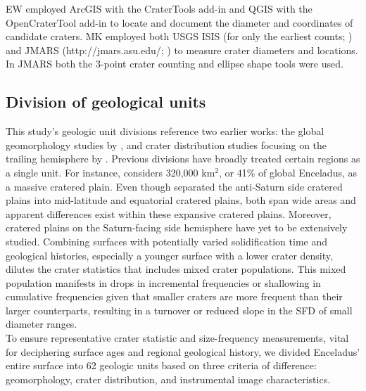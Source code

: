 \documentclass[preprint,11pt,3p,times,authoryear]{elsarticle}
\begin{document}
EW employed ArcGIS with the CraterTools add-in \citep{Kneissl2011} and QGIS with the OpenCraterTool add-in \citep{Heyer2023} to locate and document the diameter and coordinates of candidate craters. MK employed both USGS ISIS (for only the earliest counts; \citealt{Kirchoff2009}) and JMARS (http://jmars.asu.edu/; \citealt{Christensen2009}) to measure crater diameters and locations.  In JMARS both the 3-point crater counting and ellipse shape tools were used.

\subsection{Division of geological units}
\label{sub:gu}
This study’s geologic unit divisions reference two earlier works: the global geomorphology studies by \citet{CrowWillard2015}, and crater distribution studies focusing on the trailing hemisphere by \citet{Kirchoff2009}. Previous divisions have broadly treated certain regions as a single unit.
For instance, \citet{CrowWillard2015} considers 320,000 km$^{2}$, or 41\% of global Enceladus, as a massive cratered plain. Even though \citet{Kirchoff2009} separated the anti-Saturn side cratered plains into mid-latitude and equatorial cratered plains, both span wide areas and apparent differences exist within these expansive cratered plains.
Moreover, cratered plains on the Saturn-facing side hemisphere have yet to be extensively studied.
Combining surfaces with potentially varied solidification time and geological histories, especially a younger surface with a lower crater density, dilutes the crater statistics that includes mixed crater populations.
This mixed population manifests in drops in incremental frequencies or shallowing in cumulative frequencies given that smaller craters are more frequent than their larger counterparts, resulting in a turnover or reduced slope in the SFD of small diameter ranges. \\

To ensure representative crater statistic and size-frequency measurements, vital for deciphering surface ages and regional geological history, we divided Enceladus’ entire surface into 62 geologic units based on three criteria of difference: geomorphology, crater distribution, and instrumental image characteristics.
\end{document}

